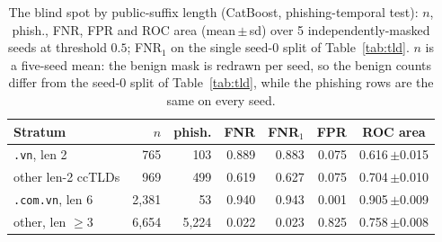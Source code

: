 \begin{table}[t]\centering
\caption{The blind spot by public-suffix length (CatBoost, phishing-temporal test): $n$, phish., FNR, FPR and ROC area (mean\,$\pm$\,sd) over 5 independently-masked seeds at threshold $0.5$; FNR$_1$ on the single seed-0 split of Table~\ref{tab:tld}. $n$ is a five-seed mean: the benign mask is redrawn per seed, so the benign counts differ from the seed-0 split of Table~\ref{tab:tld}, while the phishing rows are the same on every seed.}
\label{tab:suffix}
\footnotesize\setlength{\tabcolsep}{3.5pt}
\begin{tabular}{l r r r r r c}\toprule
Stratum & $n$ & phish. & FNR & FNR$_1$ & FPR & ROC area \\ \midrule
\texttt{.vn}, len 2 & 765 & 103 & 0.889 & 0.883 & 0.075 & 0.616{\scriptsize\,$\pm$0.015} \\
other len-2 ccTLDs & 969 & 499 & 0.619 & 0.627 & 0.075 & 0.704{\scriptsize\,$\pm$0.010} \\
\texttt{.com.vn}, len 6 & 2,381 & 53 & 0.940 & 0.943 & 0.001 & 0.905{\scriptsize\,$\pm$0.009} \\
other, len $\geq 3$ & 6,654 & 5,224 & 0.022 & 0.023 & 0.825 & 0.758{\scriptsize\,$\pm$0.008} \\
\bottomrule\end{tabular}\end{table}
